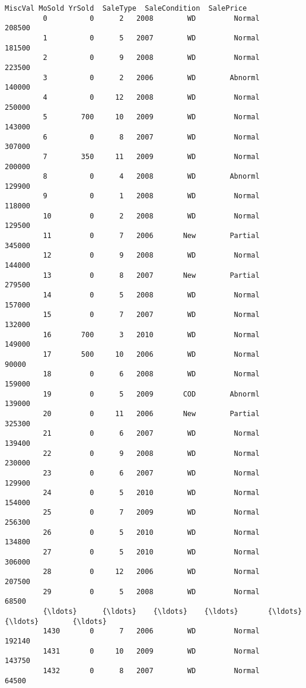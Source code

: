 \documentclass[11pt]{article}
\begin{document}
\begin{Verbatim}[commandchars=\\\{\}]
              MiscVal MoSold YrSold  SaleType  SaleCondition  SalePrice  
         0          0      2   2008        WD         Normal     208500  
         1          0      5   2007        WD         Normal     181500  
         2          0      9   2008        WD         Normal     223500  
         3          0      2   2006        WD        Abnorml     140000  
         4          0     12   2008        WD         Normal     250000  
         5        700     10   2009        WD         Normal     143000  
         6          0      8   2007        WD         Normal     307000  
         7        350     11   2009        WD         Normal     200000  
         8          0      4   2008        WD        Abnorml     129900  
         9          0      1   2008        WD         Normal     118000  
         10         0      2   2008        WD         Normal     129500  
         11         0      7   2006       New        Partial     345000  
         12         0      9   2008        WD         Normal     144000  
         13         0      8   2007       New        Partial     279500  
         14         0      5   2008        WD         Normal     157000  
         15         0      7   2007        WD         Normal     132000  
         16       700      3   2010        WD         Normal     149000  
         17       500     10   2006        WD         Normal      90000  
         18         0      6   2008        WD         Normal     159000  
         19         0      5   2009       COD        Abnorml     139000  
         20         0     11   2006       New        Partial     325300  
         21         0      6   2007        WD         Normal     139400  
         22         0      9   2008        WD         Normal     230000  
         23         0      6   2007        WD         Normal     129900  
         24         0      5   2010        WD         Normal     154000  
         25         0      7   2009        WD         Normal     256300  
         26         0      5   2010        WD         Normal     134800  
         27         0      5   2010        WD         Normal     306000  
         28         0     12   2006        WD         Normal     207500  
         29         0      5   2008        WD         Normal      68500  
         {\ldots}      {\ldots}    {\ldots}    {\ldots}       {\ldots}            {\ldots}        {\ldots}  
         1430       0      7   2006        WD         Normal     192140  
         1431       0     10   2009        WD         Normal     143750  
         1432       0      8   2007        WD         Normal      64500  

\end{Verbatim}
\end{document}
